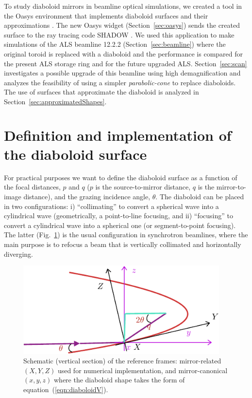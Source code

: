 \documentclass{iucr}       %
\newcommand{\inred}[1]{{\color{red}#1}}
\begin{document}

To study diaboloid mirrors in beamline optical simulations, we created a tool in the Oasys environment \cite{codeOASYS} that implements diaboloid surfaces and their approximations \inred{\cite{valSPIE} \cite{val2021}}. The new Oasys widget (Section~\ref{sec:oasys}) sends the created surface to the ray tracing code SHADOW \cite{codeSHADOW}. We used this application to make simulations of the ALS beamline 12.2.2 (Section~\ref{sec:beamline}) where the original toroid is replaced with a diaboloid and the performance is compared for the present ALS storage ring and for the future upgraded ALS. Section~\ref{sec:scan} investigates a possible upgrade of this beamline using high demagnification and analyzes the feasibility of using a simpler \emph{parabolic-cone} to replace diaboloids. The use of surfaces that approximate the diaboloid is analyzed in Section~\ref{sec:approximatedShapes}.

\section{Definition and implementation of the diaboloid surface}
\label{sec:DiaboloidEqs}

For practical purposes we want to define the diaboloid surface as a function of the focal distances, $p$ and $q$ ($p$ is the source-to-mirror distance, $q$ is the mirror-to-image distance), and the grazing incidence angle, $\theta$. The diaboloid can be placed in two configurations: i) ``collimating'' to convert a spherical wave into a cylindrical wave (geometrically, a point-to-line focusing, and ii) ``focusing'' to convert a cylindrical wave into a spherical one (or segment-to-point focusing). The latter (Fig.~\ref{fig:frame}) is the usual configuration in synchrotron beamlines, where the main purpose is to refocus a beam that is vertically collimated and horizontally diverging. 


\begin{figure}\label{fig:frame}
\includegraphics[width=0.95\textwidth]{figures/fig1.pdf}
%
\caption{Schematic (vertical section) of the reference frames: mirror-related $(X,Y,Z)$ used for numerical implementation, and mirror-canonical $(x,y,z)$ where the diaboloid shape takes the form of equation~(\ref{eqn:diaboloidV}). }
\end{figure}
\end{document}
